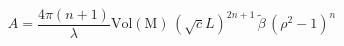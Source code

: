 \begin{equation}
A=\frac{4\pi(n+1)}{\lambda}\mathrm{Vol(M)}\,(\sqrt{c}L)^{2n+1}\,\tilde{\beta}\,(\rho^2-1)^n
\end{equation}

